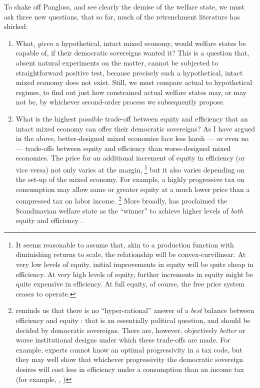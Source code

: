 
To shake off Pangloss, and see clearly the demise of the welfare state, we must ask three new questions, that so far, much of the retrenchment literature has shirked:
\begin{enumerate}
	\item What, \emph{given} a hypothetical, intact mixed economy, would welfare states be capable of, if their democratic sovereigns wanted it?
	This is a question that, absent natural experiments on the matter, cannot be subjected to straightforward positive test, because precisely such a hypothetical, intact mixed economy does not exist.
	Still, we must compare actual to hypothetical regimes, to find out just how constrained actual welfare states may, or may not be, by whichever second-order process we subsequently propose.

	\item What is the highest possible trade-off between equity and efficiency that an intact mixed economy can offer their democratic sovereigns?
	As I have argued in the above, better-designed mixed economies face less harsh --- or even no --- trade-offs between equity and efficiency than worse-designed mixed economies.
	The price for an additional increment of equity in efficiency (or vice versa) not only varies at the margin,
	\footnote{
		It seems reasonable to assume that, akin to a production function with diminishing returns to scale, the relationship will be convex-curvilinear.
		At very low levels of equity, initial improvements in equity will be quite cheap in efficiency.
		At very high levels of equity, further increments in equity might be quite expensive in efficiency.
		At full equity, of course, the free price system ceases to operate.
	}
	but it also varies depending on the set-up of the mixed economy.
	For example, a highly progressive tax on consumption may allow same or greater equity at a much lower price than a compressed tax on labor income.
	\footnote{
		\citeauthor{Offe2003} reminds us that there is no ``hyper-rational'' answer of a \emph{best} balance between efficiency and equity \citeyearpar[445]{Offe2003}:
		that is an essentially political question, and should be decided by democratic sovereigns.
		There are, however, objectively \emph{better} or {worse} institutional designs under which these trade-offs are made.
		For example, experts cannot know an optimal progressivity in a tax code, but they may well show that whichever progressivity the democratic sovereign desires will cost less in efficiency under a consumption than an income tax (for example, \citealt{McCaffery2005}, \citealt{Frank2005})
	}
	More broadly, \citeauthor{Ganssmann2010} has proclaimed the Scandinavian welfare state as the ``winner'' to achieve higher levels of \emph{both} equity and efficiency \citeyearpar[343]{Ganssmann2010}.


\end{enumerate}
